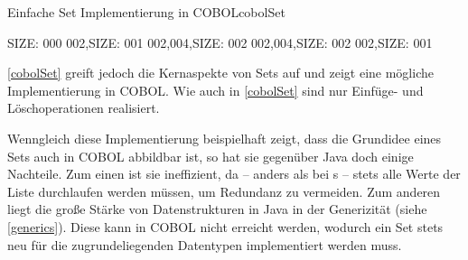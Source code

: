\clearpage

\begin{codeWithCaption}{Einfache Set Implementierung in COBOL}{cobolSet}
     \cFollow
\begin{shellwindow}
SIZE: 000
002,SIZE: 001
002,004,SIZE: 002
002,004,SIZE: 002
002,SIZE: 001
\end{shellwindow}
\end{codeWithCaption}

\autoref{cobolSet} greift jedoch die Kernaspekte von Sets auf und zeigt eine mögliche Implementierung in COBOL. Wie auch in \autoref{cobolSet} sind nur Einfüge- und Löschoperationen realisiert. 

Wenngleich diese Implementierung beispielhaft zeigt, dass die Grundidee eines Sets auch in COBOL abbildbar ist, so hat sie gegenüber Java doch einige Nachteile. Zum einen ist sie ineffizient, da -- anders als \zB bei s -- stets alle Werte der Liste durchlaufen werden müssen, um Redundanz zu vermeiden. Zum anderen liegt die große Stärke von Datenstrukturen in Java in der Generizität (siehe \autoref{generics}). Diese kann in COBOL nicht erreicht werden, wodurch ein Set stets neu für die zugrundeliegenden Datentypen implementiert werden muss.